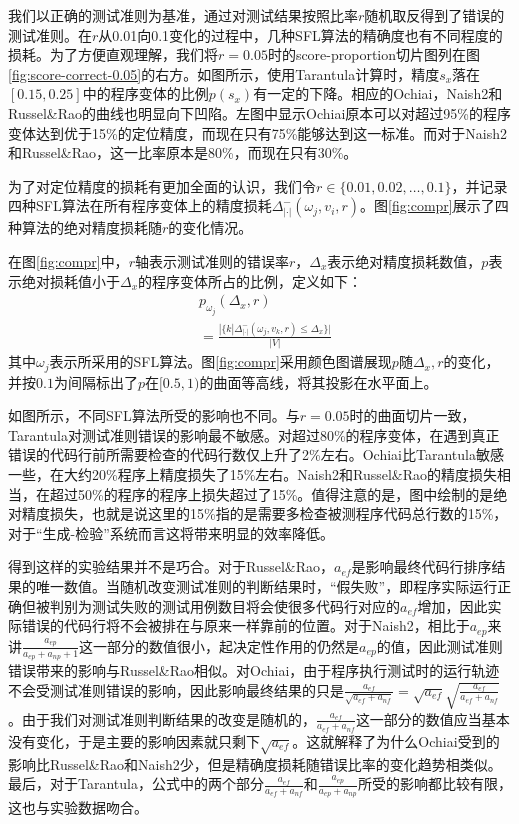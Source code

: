 我们以正确的测试准则为基准，通过对测试结果按照比率$r$随机取反得到了错误的测试准则。在$r$从0.01向0.1变化的过程中，几种SFL算法的精确度也有不同程度的损耗。为了方便直观理解，我们将$r=0.05$时的score-proportion切片图列在图\ref{fig:score-correct-0.05}的右方。如图所示，使用Tarantula计算时，精度$s_x$落在$[0.15, 0.25]$中的程序变体的比例$p(s_x)$有一定的下降。相应的Ochiai，Naish2和Russel\&Rao的曲线也明显向下凹陷。左图中显示Ochiai原本可以对超过95\%的程序变体达到优于15\%的定位精度，而现在只有75\%能够达到这一标准。而对于Naish2和Russel\&Rao，这一比率原本是80\%，而现在只有30\%。

为了对定位精度的损耗有更加全面的认识，我们令$r\in \{0.01, \allowbreak 0.02, \ldots, 0.1\}$，并记录四种SFL算法在所有程序变体上的精度损耗$\Delta_{|\cdot|}^{-}(\omega_j, v_i, r)$。图\ref{fig:compr}展示了四种算法的绝对精度损耗随$r$的变化情况。

在图\ref{fig:compr}中，$r$轴表示测试准则的错误率$r$，$\Delta_x$表示绝对精度损耗数值，$p$表示绝对损耗值小于$\Delta_x$的程序变体所占的比例，定义如下：
\begin{equation*}
\begin{aligned}
& p_{\omega_j}(\Delta_x, r) \\
& = \frac{|\{k|\Delta_{|\cdot|}^{-}(\omega_j, v_k, r) \le \Delta_x\}|}{|V|}
\end{aligned}
\end{equation*}
其中$\omega_j$表示所采用的SFL算法。图\ref{fig:compr}采用颜色图谱展现$p$随$\Delta_x, r$的变化，并按$0.1$为间隔标出了$p$在$[0.5, 1)$的曲面等高线，将其投影在水平面上。

如图所示，不同SFL算法所受的影响也不同。与$r=0.05$时的曲面切片一致，Tarantula对测试准则错误的影响最不敏感。对超过80\%的程序变体，在遇到真正错误的代码行前所需要检查的代码行数仅上升了2\%左右。Ochiai比Tarantula敏感一些，在大约20\%程序上精度损失了15\%左右。Naish2和Russel\&Rao的精度损失相当，在超过50\%的程序的程序上损失超过了15\%。值得注意的是，图中绘制的是绝对精度损失，也就是说这里的15\%指的是需要多检查被测程序代码总行数的15\%，对于“生成-检验”系统而言这将带来明显的效率降低。

得到这样的实验结果并不是巧合。对于Russel\&Rao，$a_{ef}$是影响最终代码行排序结果的唯一数值。当随机改变测试准则的判断结果时，“假失败”，即程序实际运行正确但被判别为测试失败的测试用例数目将会使很多代码行对应的$a_{ef}$增加，因此实际错误的代码行将不会被排在与原来一样靠前的位置。对于Naish2，相比于$a_{ep}$来讲$\frac{a_{ep}}{a_{ep} + a_{np} + 1}$这一部分的数值很小，起决定性作用的仍然是$a_{ep}$的值，因此测试准则错误带来的影响与Russel\&Rao相似。对Ochiai，由于程序执行测试时的运行轨迹不会受测试准则错误的影响，因此影响最终结果的只是$\frac{a_{ef}}{\sqrt{a_{ef} + a_{nf}}} = \sqrt{a_{ef}}\sqrt{\frac{a_{ef}}{a_{ef} + a_{nf}}}$。由于我们对测试准则判断结果的改变是随机的，$\frac{a_{ef}}{a_{ef} + a_{nf}}$这一部分的数值应当基本没有变化，于是主要的影响因素就只剩下$\sqrt{a_{ef}}$。这就解释了为什么Ochiai受到的影响比Russel\&Rao和Naish2少，但是精确度损耗随错误比率的变化趋势相类似。最后，对于Tarantula，公式中的两个部分$\frac{a_{ef}}{a_{ef} + a_{nf}}$和$\frac{a_{ep}}{a_{ep} + a_{np}}$所受的影响都比较有限，这也与实验数据吻合。

